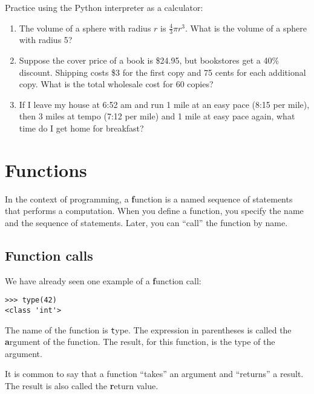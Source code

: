\documentclass[
DIV=11,
fontsize=13,
twoside,
headinclude=false,
titlepage=firstiscover,
abstract=true,
headsepline=true,
footsepline=true,
chapterprefix=true, %
headings=big,
bibliography=totoc,%
captions=tableheading
]{scrbook}
\theoremstyle{definition}
\begin{document}
\begin{exercise}
\normalfont

Practice using the Python interpreter as a calculator: 

\begin{enumerate}

\item The volume of a sphere with radius $r$ is $\frac{4}{3} \pi r^3$.
  What is the volume of a sphere with radius 5?

\item Suppose the cover price of a book is \$24.95, but bookstores get a
  40\% discount.  Shipping costs \$3 for the first copy and 75 cents
  for each additional copy.  What is the total wholesale cost for
  60 copies?

\item If I leave my house at 6:52 am and run 1 mile at an easy pace
  (8:15 per mile), then 3 miles at tempo (7:12 per mile) and 1 mile at
  easy pace again, what time do I get home for breakfast?

\end{enumerate}
\end{exercise}


\chapter{Functions}
\label{funcchap}

In the context of programming, a {\textbf function} is a named sequence of
statements that performs a computation.  When you define a function,
you specify the name and the sequence of statements.  Later, you can
``call'' the function by name.  

\section{Function calls}
\label{functionchap}

We have already seen one example of a {\textbf function call}:

\begin{lstlisting}
>>> type(42)
<class 'int'>
\end{lstlisting}
%
The name of the function is {\texttt type}.  The expression in parentheses
is called the {\textbf argument} of the function.  The result, for this
function, is the type of the argument.

It is common to say that a function ``takes'' an argument and ``returns''
a result.  The result is also called the {\textbf return value}.
\end{document}
